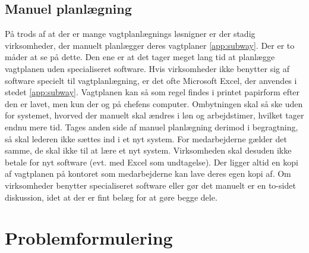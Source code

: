 \subsection{Manuel planlægning}
På trods af at der er mange vagtplanlægnings løsnigner er der stadig virksomheder, der manuelt planlægger deres vagtplaner \ref{app:subway}. Der er to måder at se på dette. Den ene er at det tager meget lang tid at planlægge vagtplanen uden specialiseret software. Hvis virksomheder ikke benytter sig af software specielt til vagtplanlægning, er det ofte Microsoft Excel, der anvendes i stedet \ref{app:subway}. Vagtplanen kan så som regel findes i printet papirform efter den er lavet, men kun der og på chefens computer. Ombytningen skal så ske uden for systemet, hvorved der manuelt skal ændres i løn og arbejdstimer, hvilket tager endnu mere tid. Tages anden side af manuel planlægning derimod i begragtning, så skal lederen ikke sættes ind i et nyt system. For medarbejderne gælder det samme, de skal ikke til at lære et nyt system. Virksomheden skal desuden ikke betale for nyt software (evt. med Excel som undtagelse). Der ligger altid en kopi af vagtplanen på kontoret som medarbejderne kan lave deres egen kopi af. Om virksomheder benytter specialiseret software eller gør det manuelt er en to-sidet diskussion, idet at der er fint belæg for at gøre begge dele.





\section{Problemformulering}

